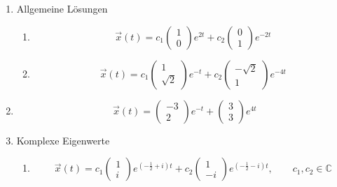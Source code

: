 \begin{enumerate}
    \item Allgemeine Lösungen
          \begin{enumerate}
              \item
                    \[
                        \vec{x}(t)
                        = c_1 \begin{pmatrix} 1 \\ 0 \end{pmatrix} e^{2t}
                        + c_2 \begin{pmatrix} 0 \\ 1 \end{pmatrix} e^{-2t}
                    \]

              \item
                    \[
                        \vec{x}(t)
                        = c_1 \begin{pmatrix} 1 \\ \sqrt{2} \end{pmatrix} e^{-t}
                        + c_2 \begin{pmatrix} -\sqrt{2} \\ 1 \end{pmatrix} e^{-4t}
                    \]
          \end{enumerate}

    \item
          \[
              \vec{x}(t)
              = \begin{pmatrix} -3 \\ 2 \end{pmatrix} e^{-t}
              + \begin{pmatrix} 3 \\ 3 \end{pmatrix} e^{4t}
          \]

    \item Komplexe Eigenwerte
          \begin{enumerate}
              \item
                    \[
                        \vec{x}(t)
                        = c_1 \begin{pmatrix} 1 \\ i \end{pmatrix}
                        e^{\left(-\frac12+i\right)t}
                        + c_2 \begin{pmatrix} 1 \\ -i \end{pmatrix}
                        e^{\left(-\frac12-i\right)t},
                        \qquad c_1,c_2\in\mathbb{C}
                    \]


\end{enumerate}
\end{enumerate}
